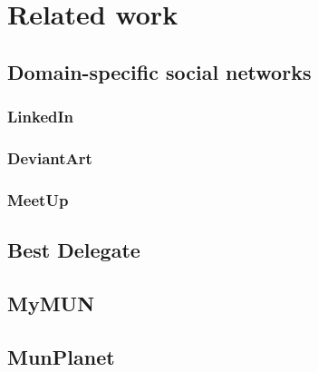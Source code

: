 \chapter{Related work}
\label{chapter:relatedwork}

\section{Domain-specific social networks}
\subsection{LinkedIn}
\subsection{DeviantArt}
\subsection{MeetUp}

\section{Best Delegate}

\section{MyMUN}

\section{MunPlanet}
